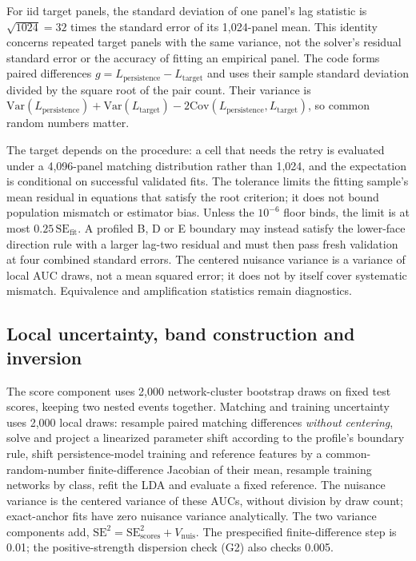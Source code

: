 For iid target panels, the standard deviation of one panel's lag statistic is $\sqrt{1024}=32$ times the standard error of its 1,024-panel mean. This identity concerns repeated target panels with the same variance, not the solver's residual standard error or the accuracy of fitting an empirical panel. The code forms paired differences $g=L_{\mathrm{persistence}}-L_{\mathrm{target}}$ and uses their sample standard deviation divided by the square root of the pair count. Their variance is $\mathrm{Var}(L_{\mathrm{persistence}})+\mathrm{Var}(L_{\mathrm{target}})-2\mathrm{Cov}(L_{\mathrm{persistence}},L_{\mathrm{target}})$, so common random numbers matter. %

The target depends on the procedure: a cell that needs the retry is evaluated under a 4,096-panel matching distribution rather than 1,024, and the expectation is conditional on successful validated fits. The tolerance limits the fitting sample's mean residual in equations that satisfy the root criterion; it does not bound population mismatch or estimator bias. Unless the $10^{-6}$ floor binds, the limit is at most $0.25\,\mathrm{SE}_{\mathrm{fit}}$. A profiled B, D or E boundary may instead satisfy the lower-face direction rule with a larger lag-two residual and must then pass fresh validation at four combined standard errors. The centered nuisance variance is a variance of local AUC draws, not a mean squared error; it does not by itself cover systematic mismatch. Equivalence and amplification statistics remain diagnostics. %

\subsection{Local uncertainty, band construction and inversion}\label{sec:dd-band}

The score component uses 2,000 network-cluster bootstrap draws on fixed test scores, keeping two nested events together. Matching and training uncertainty uses 2,000 local draws: resample paired matching differences \emph{without centering}, solve and project a linearized parameter shift according to the profile's boundary rule, shift persistence-model training and reference features by a common-random-number finite-difference Jacobian of their mean, resample training networks by class, refit the LDA and evaluate a fixed reference. The nuisance variance is the centered variance of these AUCs, without division by draw count; exact-anchor fits have zero nuisance variance analytically. The two variance components add, $\mathrm{SE}^2=\mathrm{SE}_{\mathrm{scores}}^2+V_{\mathrm{nuis}}$. The prespecified finite-difference step is 0.01; the positive-strength dispersion check (G2) also checks 0.005.

